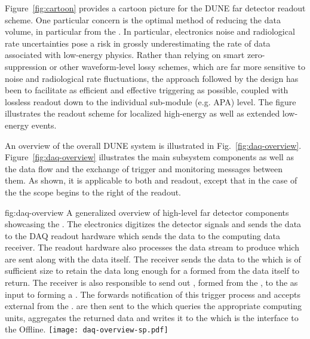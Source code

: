 Figure~\ref{fig:cartoon} provides a cartoon picture for the DUNE far
detector readout scheme. One particular concern is the optimal method
of reducing the data volume, in particular from the
.  In particular, electronics noise and
radiological rate uncertainties pose a risk in grossly underestimating
the rate of data associated with low-energy physics.
Rather than relying on smart zero-suppression or other waveform-level
lossy schemes, which are far more sensitive to noise and radiological
rate fluctuations, the approach followed by the 
design has been to facilitate as efficient and effective 
triggering as possible, coupled with lossless readout down to the individual
sub-module (e.g. APA) level. The figure illustrates the
readout scheme for localized high-energy as well as extended
low-energy events.

An overview of the overall DUNE   system is illustrated in
Fig.~\ref{fig:daq-overview}. 
Figure~\ref{fig:daq-overview} illustrates the main  subsystem
components as well as the data flow and the exchange of trigger and
monitoring messages between them.
As shown, it is applicable to both  and  readout, except
that in the case of the  the  scope begins to the right of
the  readout. 


\begin{dunefigure}{fig:daq-overview}
  {A generalized overview of high-level far detector 
    components showcasing the  . 
    The electronics digitizes the detector signals and sends the data
    to the DAQ  readout hardware which sends the data to the
     computing data receiver.
    The  readout hardware also processes the data stream to
    produce  which are sent along with the data
    itself.
    The receiver sends the data to the  which is of
    sufficient size to retain the data long enough for a
     formed from the data itself to return.
    The receiver is also responsible to send out
    , formed from the , to
    the  as input to forming a . 
    The  forwards notification of this trigger process and
    accepts external  from the .
     are then sent to the  which queries
    the appropriate  computing units, aggregates the
    returned data and writes it to the  which is the
    interface to the Offline.}
\texttt{[image: daq-overview-sp.pdf]}%
\end{dunefigure}


